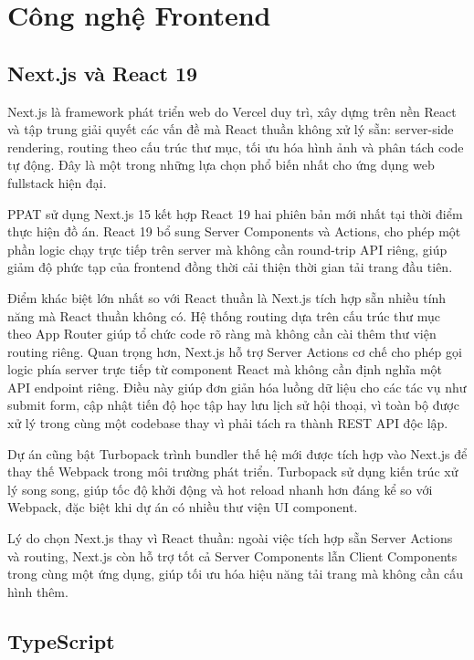 \documentclass[../main.tex]{subfiles}
\begin{document}
\section{Công nghệ Frontend}

\subsection{Next.js và React 19}

Next.js là framework phát triển web do Vercel duy trì, xây dựng trên nền React và tập trung giải quyết các vấn đề mà React thuần không xử lý sẵn: server-side rendering, routing theo cấu trúc thư mục, tối ưu hóa hình ảnh và phân tách code tự động. Đây là một trong những lựa chọn phổ biến nhất cho ứng dụng web fullstack hiện đại.

PPAT sử dụng Next.js 15 kết hợp React 19 hai phiên bản mới nhất tại thời điểm thực hiện đồ án. React 19 bổ sung Server Components và Actions, cho phép một phần logic chạy trực tiếp trên server mà không cần round-trip API riêng, giúp giảm độ phức tạp của frontend đồng thời cải thiện thời gian tải trang đầu tiên.

Điểm khác biệt lớn nhất so với React thuần là Next.js tích hợp sẵn nhiều tính năng mà React thuần không có. Hệ thống routing dựa trên cấu trúc thư mục theo App Router giúp tổ chức code rõ ràng mà không cần cài thêm thư viện routing riêng. Quan trọng hơn, Next.js hỗ trợ Server Actions cơ chế cho phép gọi logic phía server trực tiếp từ component React mà không cần định nghĩa một API endpoint riêng. Điều này giúp đơn giản hóa luồng dữ liệu cho các tác vụ như submit form, cập nhật tiến độ học tập hay lưu lịch sử hội thoại, vì toàn bộ được xử lý trong cùng một codebase thay vì phải tách ra thành REST API độc lập.

Dự án cũng bật Turbopack trình bundler thế hệ mới được tích hợp vào Next.js để thay thế Webpack trong môi trường phát triển. Turbopack sử dụng kiến trúc xử lý song song, giúp tốc độ khởi động và hot reload nhanh hơn đáng kể so với Webpack, đặc biệt khi dự án có nhiều thư viện UI component.

Lý do chọn Next.js thay vì React thuần: ngoài việc tích hợp sẵn Server Actions và routing, Next.js còn hỗ trợ tốt cả Server Components lẫn Client Components trong cùng một ứng dụng, giúp tối ưu hóa hiệu năng tải trang mà không cần cấu hình thêm.

\subsection{TypeScript}
\end{document}
